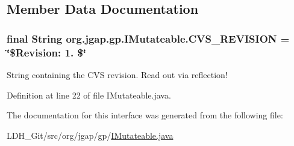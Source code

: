 \subsection{Member Data Documentation}
\hypertarget{interfaceorg_1_1jgap_1_1gp_1_1_i_mutateable_afe12185291191b8be44df8c3d764a1c5}{
\subsubsection[{C\-V\-S\-\_\-\-R\-E\-V\-I\-S\-I\-O\-N}]{\setlength{\rightskip}{0pt plus 5cm}final String org.\-jgap.\-gp.\-I\-Mutateable.\-C\-V\-S\-\_\-\-R\-E\-V\-I\-S\-I\-O\-N = \char`\"{}\$Revision\-: 1. \$\char`\"{}\hspace{0.3cm}{\ttfamily [static]}}}\label{interfaceorg_1_1jgap_1_1gp_1_1_i_mutateable_afe12185291191b8be44df8c3d764a1c5}
String containing the C\-V\-S revision. Read out via reflection! 

Definition at line 22 of file I\-Mutateable.\-java.



The documentation for this interface was generated from the following file\-:\begin{DoxyCompactItemize}
\item 
L\-D\-H\-\_\-\-Git/src/org/jgap/gp/\hyperlink{_i_mutateable_8java}{I\-Mutateable.\-java}\end{DoxyCompactItemize}
